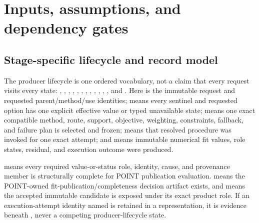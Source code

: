 \section{Inputs, assumptions, and dependency gates}\label{sec:inputs}

\subsection{Stage-specific lifecycle and record model}\label{sec:input-record}

The producer lifecycle is one ordered vocabulary, not a claim that every
request visits every state:
, , ,
, , ,
, ,
, , ,
, and . Here  is the
immutable request and requested parent/method/use identities;
 means every sentinel and requested option has one explicit
effective value or typed unavailable state;  means one exact
compatible method, route, support, objective, weighting, constraints,
fallback, and failure plan is selected and frozen;  means that
resolved procedure was invoked for one exact attempt; and
 means immutable numerical fit values, role states,
residual, and execution outcome were produced.

 means every required value-or-status
role, identity, cause, and provenance member is structurally complete for
POINT publication evaluation.  means the
POINT-owned fit-publication/completeness decision artifact exists, and
 means the accepted immutable candidate is exposed under its
exact product role. If an execution-attempt identity named
 is retained in a representation, it is evidence beneath
, never a competing producer-lifecycle state.

